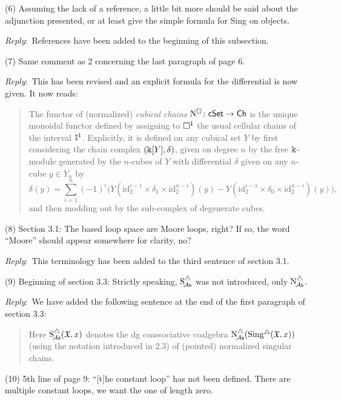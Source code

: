 \documentclass{amsart}
\newcommand{\ar}{\medskip\noindent\textit{Reply}:\ }
\newcommand{\rp}{\medskip\noindent}
\begin{document}
	\rp (6) Assuming the lack of a reference, a little bit more should be said about the adjunction presented, or at least give the simple formula for Sing on objects.

	\ar References have been added to the beginning of this subsection.

	\rp (7) Same comment as 2 concerning the last paragraph of page 6.

	\ar This has been revised and an explicit formula for the differential is now given. It now reads:

	\begin{quote}
		The functor of (normalized) \textit{cubical chains} $\operatorname{N^{\square}} \colon \mathsf{cSet} \to \mathsf{Ch}$ is the unique monoidal functor defined by assigning to $\square^1$ the usual cellular chains of the interval $\mathbb{I}^1$.
		Explicitly, it is defined on any cubical set $Y$ by first considering the chain complex $(\Bbbk[Y], \delta)$, given on degree $n$ by the free $\Bbbk$-module generated by the $n$-cubes of $Y$ with differential $\delta$ given on any $n$-cube $y \in Y_n$ by
		\[
		\delta(y) = \sum_{i=1}^n (-1)^i
		\big(
		Y(\text{id}_2^{i-1} \times \delta_1 \times \text{id}_2^{n-i})(y) -
		Y(\text{id}_2^{i-1} \times \delta_0 \times \text{id}_2^{n-i})(y)
		\big),
		\]
		and then modding out by the sub-complex of degenerate cubes.
	\end{quote}

	\rp (8) Section 3.1: The based loop space are Moore loops, right?
	If so, the word ``Moore'' should appear somewhere for clarity, no?

	\ar This terminology has been added to the third sentence of section 3.1.

	\rp (9) Beginning of section 3.3: Strictly speaking, $\operatorname{S^{\triangle}_{\!{\mathcal{A}\mathsf{s}}}}$ was not introduced, only $\operatorname{N^{\triangle}_{\!{\mathcal{A}\mathsf{s}}}}$.

	\ar We have added the following sentence at the end of the first paragraph of section 3.3:
    \begin{quote}
         Here $\operatorname{S^{\triangle}_{\!{\mathcal{A}\mathsf{s}}}}(\mathfrak{X},x)$ denotes the dg coassociative coalgebra $\operatorname{N^{\triangle}_{\!{\mathcal{A}\mathsf{s}}}}(\operatorname{Sing^{\triangle}}(\mathfrak{X},x))$ (using the notation introduced in 2.3) of (pointed) normalized singular chains.
    \end{quote}

	\rp (10) 5th line of page 9: “[t]he constant loop” has not been defined.
	There are multiple constant loops, we want the one of length zero.
\end{document}
